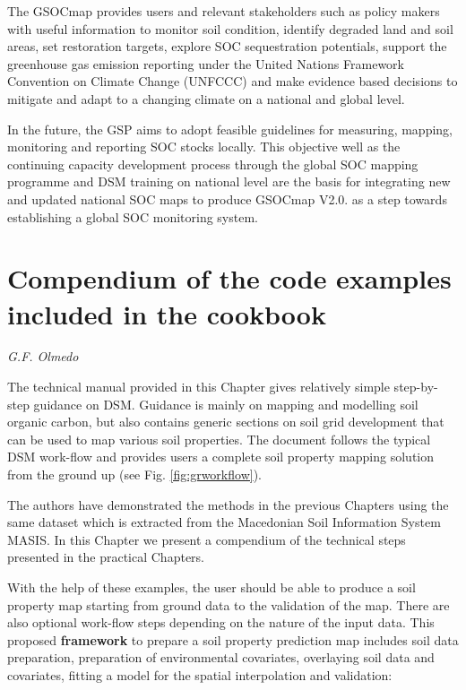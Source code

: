 \documentclass[10pt,b5paper,]{book}
\theoremstyle{definition}
\theoremstyle{definition}
\theoremstyle{definition}
\theoremstyle{remark}
\begin{document}
The GSOCmap provides users and relevant stakeholders such as policy
makers with useful information to monitor soil condition, identify
degraded land and soil areas, set restoration targets, explore SOC
sequestration potentials, support the greenhouse gas emission reporting
under the United Nations Framework Convention on Climate Change (UNFCCC)
and make evidence based decisions to mitigate and adapt to a changing
climate on a national and global level.

In the future, the GSP aims to adopt feasible guidelines for measuring,
mapping, monitoring and reporting SOC stocks locally. This objective
well as the continuing capacity development process through the global
SOC mapping programme and DSM training on national level are the basis
for integrating new and updated national SOC maps to produce GSOCmap
V2.0. as a step towards establishing a global SOC monitoring system.

\hypertarget{compendium}{%
\chapter{Compendium of the code examples included in the
cookbook}\label{compendium}}

\emph{G.F. Olmedo}

The technical manual provided in this Chapter gives relatively simple
step-by-step guidance on DSM. Guidance is mainly on mapping and
modelling soil organic carbon, but also contains generic sections on
soil grid development that can be used to map various soil properties.
The document follows the typical DSM work-flow and provides users a
complete soil property mapping solution from the ground up (see Fig.
\ref{fig:grworkflow}).

The authors have demonstrated the methods in the previous Chapters using
the same dataset which is extracted from the Macedonian Soil Information
System MASIS. In this Chapter we present a compendium of the technical
steps presented in the practical Chapters.

With the help of these examples, the user should be able to produce a
soil property map starting from ground data to the validation of the
map. There are also optional work-flow steps depending on the nature of
the input data. This proposed \textbf{framework} to prepare a soil
property prediction map includes soil data preparation, preparation of
environmental covariates, overlaying soil data and covariates, fitting a
model for the spatial interpolation and validation:
\end{document}
